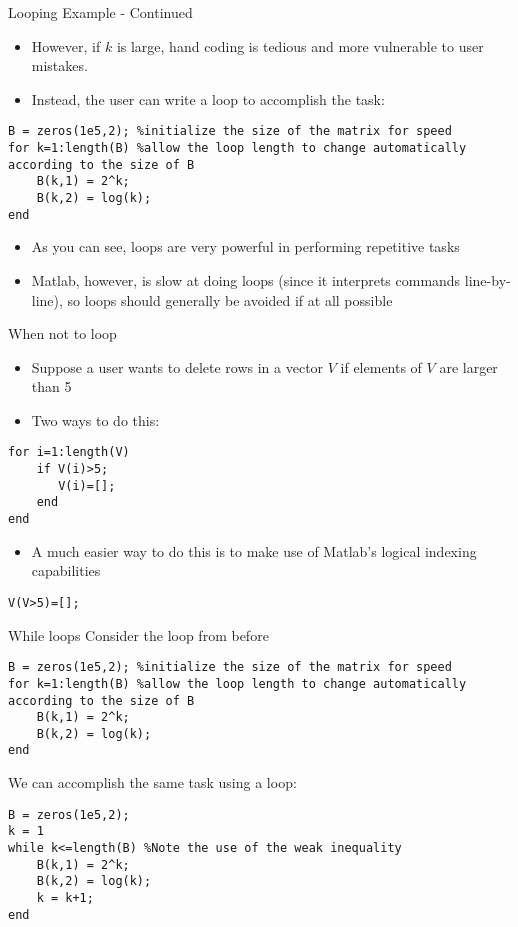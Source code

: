 \documentclass[english,xcolor=dvipsnames]{beamer}
\begin{document}
\begin{frame}[fragile]{Looping Example - Continued}
\begin{itemize}
	\item However, if $k$ is large, hand coding is tedious and more vulnerable to user mistakes.
	\item Instead, the user can write a  loop to accomplish the task:
\end{itemize}
\begin{lstlisting}
B = zeros(1e5,2); %initialize the size of the matrix for speed
for k=1:length(B) %allow the loop length to change automatically according to the size of B
    B(k,1) = 2^k;
    B(k,2) = log(k);
end
\end{lstlisting}
\begin{itemize}
	\item As you can see, loops are very powerful in performing repetitive tasks
	\item Matlab, however, is slow at doing loops (since it interprets commands line-by-line), so loops should generally be avoided if at all possible
\end{itemize}
\end{frame}

\begin{frame}[fragile]{When not to loop}
\begin{itemize}
	\item Suppose a user wants to delete rows in a vector $V$ if elements of $V$ are larger than 5
	\item Two ways to do this:
\end{itemize}
\begin{lstlisting}
for i=1:length(V)
    if V(i)>5;
       V(i)=[];
    end
end
\end{lstlisting}
\begin{itemize}
	\item A much easier way to do this is to make use of Matlab's logical indexing capabilities
\end{itemize}
\begin{lstlisting}
V(V>5)=[];
\end{lstlisting}
\end{frame}


\begin{frame}[fragile]{While loops}
Consider the  loop from before
\begin{lstlisting}
B = zeros(1e5,2); %initialize the size of the matrix for speed
for k=1:length(B) %allow the loop length to change automatically according to the size of B
    B(k,1) = 2^k;
    B(k,2) = log(k);
end
\end{lstlisting}
We can accomplish the same task using a  loop:
\begin{lstlisting}
B = zeros(1e5,2);
k = 1
while k<=length(B) %Note the use of the weak inequality
    B(k,1) = 2^k;
    B(k,2) = log(k);
    k = k+1;
end
\end{lstlisting}
\end{frame}
\end{document}
